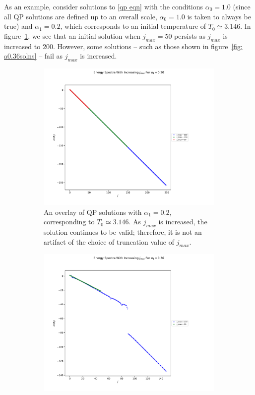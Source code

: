 \documentclass[letterpaper,11pt]{article}
\begin{document}
As an example, consider solutions to \eqref{qp eqn} with the conditions $\alpha_0 = 1.0$ (since all QP solutions are defined up to an overall scale, $\alpha_0 = 1.0$ is taken to always be true) and $\alpha_1 = 0.2$, which corresponds to an initial temperature of $T_0 \simeq 3.146$. In figure~\ref{fig: a0.2solns}, we see that an initial solution when $j_{max}=50$ persists as $j_{max}$ is increased to $200$. However, some solutions -- such as those shown in figure~\ref{fig: a0.36solns} -- fail as $j_{max}$ is increased. 

\begin{figure}[h]
	\centering
	\begin{subfigure}[t]{0.45\textwidth}
		\includegraphics[width=\textwidth]{a0_2overlay}
		\caption{An overlay of QP solutions with $\alpha_1 = 0.2$, corresponding to $T_0 \simeq 3.146$. As $j_{max}$ is increased, the solution continues to be valid; therefore, it is not an artifact of the choice of truncation value of $j_{max}$.}
		\label{fig: a0.2solns}
	\end{subfigure}
	\:
	\begin{subfigure}[t]{0.45\textwidth}
		\includegraphics[width=\textwidth]{a0_36overlay}

\end{subfigure}
\end{figure}
\end{document}
